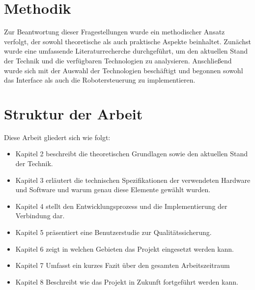 \section{Methodik}
Zur Beantwortung dieser Fragestellungen wurde ein methodischer Ansatz verfolgt, der sowohl theoretische als auch praktische Aspekte beinhaltet. Zunächst wurde eine umfassende Literaturrecherche durchgeführt, um den aktuellen Stand der Technik und die verfügbaren Technologien zu analysieren. Anschließend wurde sich mit der Auswahl der Technologien beschäftigt und begonnen sowohl das Interface als auch die Robotersteuerung zu implementieren.

\section{Struktur der Arbeit}
Diese Arbeit gliedert sich wie folgt:
\begin{itemize}
    \item Kapitel 2 beschreibt die theoretischen Grundlagen sowie den aktuellen Stand der Technik.
    \item Kapitel 3 erläutert die technischen Spezifikationen der verwendeten Hardware und Software und warum genau diese Elemente gewählt wurden.
    \item Kapitel 4 stellt den Entwicklungsprozess und die Implementierung der Verbindung dar.
    \item Kapitel 5 präsentiert eine Benutzerstudie zur Qualitätssicherung.
    \item Kapitel 6 zeigt in welchen Gebieten das Projekt eingesetzt werden kann.
    \item Kapitel 7 Umfasst ein kurzes Fazit über den gesamten Arbeitszeitraum
    \item Kapitel 8 Beschreibt wie das Projekt in Zukunft fortgeführt werden kann.
\end{itemize}

